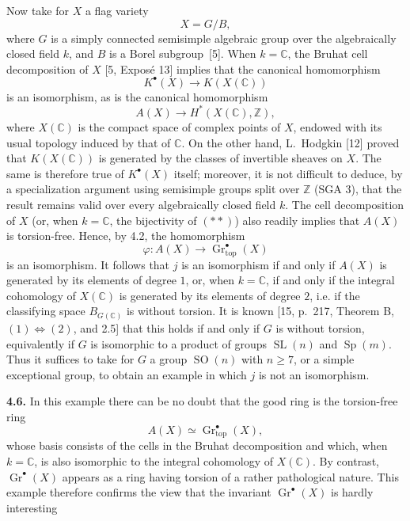 \documentclass[11pt]{article}
\newcommand{\C}{\mathbb C}
\newcommand{\Z}{\mathbb Z}
\newcommand{\Gtop}{\operatorname{Gr}_{\mathrm{top}}}
\begin{document}
Now take for $X$ a flag variety
\[
 X=G/B,
\]
where $G$ is a simply connected semisimple algebraic group over the
algebraically closed field $k$, and $B$ is a Borel subgroup~[5]. When
$k=\C$, the Bruhat cell decomposition of $X$ [5, Exposé 13] implies that
the canonical homomorphism
\begin{equation*}\tag{*}
 K^\bullet(X)\longrightarrow K(X(\C))
\end{equation*}
is an isomorphism, as is the canonical homomorphism
\begin{equation*}\tag{**}
 A(X)\longrightarrow H^*(X(\C),\Z),
\end{equation*}
where $X(\C)$ is the compact space of complex points of $X$, endowed with
its usual topology induced by that of $\C$. On the other hand, L.~Hodgkin
[12] proved that $K(X(\C))$ is generated by the classes of invertible
sheaves on $X$. The same is therefore true of $K^\bullet(X)$ itself;
moreover, it is not difficult to deduce, by a specialization argument using
semisimple groups split over $\Z$ (SGA 3), that the result remains valid
over every algebraically closed field $k$. The cell decomposition of $X$
(or, when $k=\C$, the bijectivity of $(**)$) also readily implies that
$A(X)$ is torsion-free. Hence, by 4.2, the homomorphism
\[
 \varphi:A(X)\longrightarrow\Gtop^\bullet(X)
\]
is an isomorphism. It follows that $j$ is an isomorphism if and only if
$A(X)$ is generated by its elements of degree $1$, or, when $k=\C$, if and
only if the integral cohomology of $X(\C)$ is generated by its elements of
degree $2$, i.e. if the classifying space $B_{G(\C)}$ is without torsion. It
is known [15, p.~217, Theorem B, $(1)\Leftrightarrow(2)$, and 2.5] that this
holds if and only if $G$ is without torsion, equivalently if $G$ is
isomorphic to a product of groups $\operatorname{SL}(n)$ and
$\operatorname{Sp}(m)$. Thus it suffices to take for $G$ a group
$\operatorname{SO}(n)$ with $n\geq7$, or a simple exceptional group, to
obtain an example in which $j$ is not an isomorphism.

\noindent\textbf{4.6.}
In this example there can be no doubt that the good ring is the torsion-free
ring
\[
 A(X)\simeq\Gtop^\bullet(X),
\]
whose basis consists of the cells in the Bruhat decomposition and which,
when $k=\C$, is also isomorphic to the integral cohomology of $X(\C)$. By
contrast, $\operatorname{Gr}^\bullet(X)$ appears as a ring having torsion
of a rather pathological nature. This example therefore confirms the view
that the invariant $\operatorname{Gr}^\bullet(X)$ is hardly interesting
\end{document}
